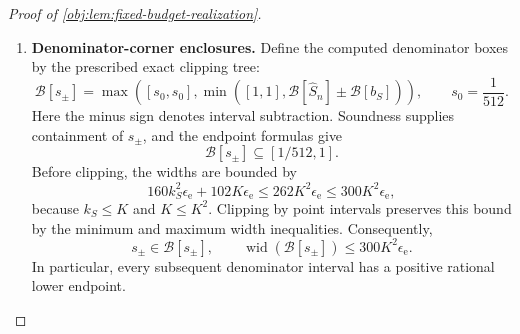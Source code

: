 \documentclass[11pt]{article}
\begin{document}
\begin{proof}[Proof of \cref{obj:lem:fixed-budget-realization}]
\begin{enumerate}
For either retained rank \(k\), the elementary inequality
\(\log u\le u-1\) for \(u>0\) gives
\[
\log k=\log(k/2)+\log2
\le(k/2-1)+1=k/2.
\]
Applying the same inequality at \(u=1/2\) gives \(\log2\ge1/2\).
Thus, for every exponent \(\tau\) in the corresponding raw power-exponent box,
\[
\tau\log k
\le2\epsilon_{\mathrm e}\log k
\le k\epsilon_{\mathrm e}
\le\frac1{16}\le\log2.
\]
It follows that
\[
k^\tau\le2,
\qquad
\left|\frac{d}{d\tau}k^\tau\right|
=k^\tau\log k\le k.
\]
These inequalities include \(k=1\), for which the derivative is zero.
The mean-value bound and the primitive endpoint errors now imply
\[
\operatorname{wid}\bigl(\mathcal B[k^\tau]\bigr)
\le k\operatorname{wid}(\mathcal B_{\mathrm{pow}})
    +2\epsilon_{\mathrm e}
\le(2k+2)\epsilon_{\mathrm e},
\]
with \(\mathcal B_{\mathrm{pow}}\) the corresponding bias-exponent box.

The variance quantity
\[
V_n(k)=\frac{10}{n}+\frac{4k}{n(n-1)}
\]
is an exactly evaluated positive rational number. Its square-root enclosure therefore satisfies
\[
\operatorname{wid}\bigl(\mathcal B[\sqrt{20V_n(k)}]\bigr)
\le2\epsilon_{\mathrm e}.
\]
Using the constants in the radius expressions, we obtain successful enclosures containing \(b_C,b_S\), with
\[
\begin{aligned}
\operatorname{wid}(\mathcal B[b_C])
&\le\bigl(8(2k_C+2)+2\bigr)\epsilon_{\mathrm e}
=(16k_C+18)\epsilon_{\mathrm e}
\le34K\epsilon_{\mathrm e},\\
\operatorname{wid}(\mathcal B[b_S])
&\le\bigl(25(2k_S+2)+2\bigr)\epsilon_{\mathrm e}
=(50k_S+52)\epsilon_{\mathrm e}
\le102K\epsilon_{\mathrm e}.
\end{aligned}
\]
The last inequalities use \(k_C,k_S\le K\) and \(K\ge1\).

\item \textbf{Denominator-corner enclosures.}
Define the computed denominator boxes by the prescribed exact clipping tree:
\[
\mathcal B[s_\pm]
=
\max\left(
[s_0,s_0],
\min\left([1,1],
\mathcal B[\widehat S_n]\pm\mathcal B[b_S]\right)
\right),
\qquad s_0=\frac1{512}.
\]
Here the minus sign denotes interval subtraction. Soundness supplies containment of \(s_\pm\), and the endpoint formulas give
\[
\mathcal B[s_\pm]\subseteq[1/512,1].
\]
Before clipping, the widths are bounded by
\[
160k_S^2\epsilon_{\mathrm e}+102K\epsilon_{\mathrm e}
\le262K^2\epsilon_{\mathrm e}
\le300K^2\epsilon_{\mathrm e},
\]
because \(k_S\le K\) and \(K\le K^2\). Clipping by point intervals preserves this bound by the minimum and maximum width inequalities. Consequently,
\[
s_\pm\in\mathcal B[s_\pm],
\qquad
\operatorname{wid}(\mathcal B[s_\pm])
\le300K^2\epsilon_{\mathrm e}.
\]
In particular, every subsequent denominator interval has a positive rational lower endpoint.


\end{enumerate}
\end{proof}
\end{document}
